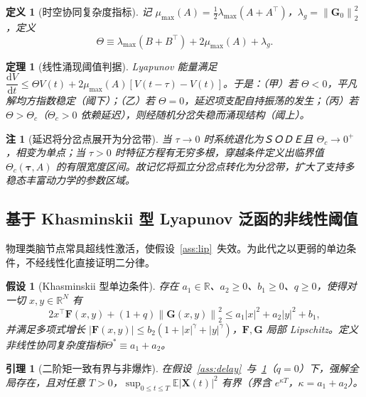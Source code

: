 \documentclass[12pt,a4paper]{ctexart}
\newcommand{\kai}[1]{{\CJKfamily{kai}#1}}
\newtheorem{theorem}{定理}
\newtheorem{lemma}{引理}
\newtheorem{definition}{定义}
\newtheorem{assumption}{假设}
\newtheorem{remark}{注}
\newcommand{\R}{\mathbb{R}}
\newcommand{\E}{\mathbb{E}}
\newcommand{\dd}{\mathrm{d}}
\newcommand{\norm}[1]{\left\lVert #1 \right\rVert}
\newcommand{\abs}[1]{\left\lvert #1 \right\rvert}
\newcommand{\X}{\mathbf{X}}
\newcommand{\F}{\mathbf{F}}
\newcommand{\G}{\mathbf{G}}
\begin{document}
\begin{definition}[时空协同复杂度指标]\label{def:theta}
记 $\mu_{\max}(A)=\tfrac12\lambda_{\max}(A+A^\top)$，$\lambda_g=\norm{\G_0}_2^2$，定义
\begin{equation}\label{eq:theta}
\Theta\equiv\lambda_{\max}(B+B^\top)+2\mu_{\max}(A)+\lambda_g .
\end{equation}
\end{definition}

\begin{theorem}[线性涌现阈值判据]\label{thm:threshold}
Lyapunov 能量满足 $\dfrac{\dd V}{\dd t}\le\Theta V(t)+2\mu_{\max}(A)[V(t-\tau)-V(t)]$。于是：（甲）若 $\Theta<0$，平凡解均方指数稳定（阈下）；（乙）若 $\Theta=0$，延迟项支配自持振荡的发生；（丙）若 $\Theta>\Theta_c$（$\Theta_c>0$ 依赖延迟），则经随机分岔失稳而涌现结构（阈上）。
\end{theorem}

\begin{remark}[延迟将分岔点展开为分岔带]\label{rmk:band}
当 $\tau\to0$ 时系统退化为ＳＯＤＥ且 $\Theta_c\to0^+$，相变为单点；当 $\tau>0$ 时特征方程有无穷多根，穿越条件定义出临界值 $\Theta_c(\bm{\tau},A)$ 的\kai{有限宽度区间}。故记忆将孤立分岔点转化为分岔带，扩大了支持多稳态丰富动力学的参数区域。
\end{remark}

\subsection{基于 Khasminskii 型 Lyapunov 泛函的非线性阈值}\label{sec:nonlinear}

\hspace{2em}物理类脑节点常具超线性激活，使假设~\ref{ass:lip}~失效。为此代之以更弱的单边条件，不经线性化直接证明二分律。

\begin{assumption}[Khasminskii 型单边条件]\label{ass:khas}
存在 $a_1\in\R$、$a_2\ge0$、$b_1\ge0$、$q\ge0$，使得对一切 $x,y\in\R^N$ 有
\begin{equation}\label{eq:khas}
2x^\top\F(x,y)+(1+q)\norm{\G(x,y)}_2^2\le a_1\abs{x}^2+a_2\abs{y}^2+b_1,
\end{equation}
并满足多项式增长 $\abs{\F(x,y)}\le b_2(1+\abs{x}^{\gamma}+\abs{y}^{\gamma})$，$\F,\G$ 局部 Lipschitz。定义\kai{非线性协同复杂度指标}$\Theta^{\ast}\equiv a_1+a_2$。
\end{assumption}

\begin{lemma}[二阶矩一致有界与非爆炸]\label{lem:moment}
在假设~\ref{ass:delay}~与~\ref{ass:khas}（$q=0$）下，强解全局存在，且对任意 $T>0$，$\sup_{0\le t\le T}\E\abs{\X(t)}^2$ 有界（界含 $e^{\kappa T}$，$\kappa=a_1+a_2$）。
\end{lemma}
\end{document}
